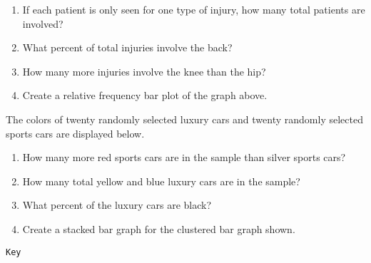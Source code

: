\documentclass{article}
\newcounter{pset}
\begin{document}
\begin{enumerate}   \setcounter{enumi}{\value{pset}}
    \item If each patient is only seen for one type of injury, how many total patients are involved?
    \item What percent of total injuries involve the back?
    \item How many more injuries involve the knee than the hip?
    \item Create a relative frequency bar plot of the graph above.
\end{enumerate}     \setcounter{pset}{\value{enumi}}

\vfill 

The colors of twenty randomly selected luxury cars and twenty randomly selected sports cars are displayed below.

\begin{center}
\end{center}

\begin{enumerate}   \setcounter{enumi}{\value{pset}}
    \item How many more red sports cars are in the sample than silver sports cars?
    \item How many total yellow and blue luxury cars are in the sample?
    \item What percent of the luxury cars are black?
    \item Create a stacked bar graph for the clustered bar graph shown.
\end{enumerate}     \setcounter{pset}{\value{enumi}}

\newpage 

\texttt{Key}
\end{document}
